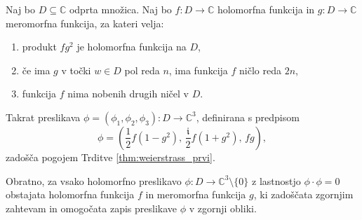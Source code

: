 \documentclass[fin1, tisk, bibtex]{fmfdelo}
\begin{document}
\begin{izrek}
    Naj bo $D \subseteq \mathbb{C}$ odprta množica. Naj bo $f: D \rightarrow \mathbb{C}$ holomorfna funkcija in $g: D \rightarrow \mathbb{C}$ meromorfna funkcija, za kateri velja:
    \begin{enumerate}
        \item produkt $f g^2$ je holomorfna funkcija na $D$,
        \item če ima $g$ v točki $w \in D$ pol reda $n$, ima funkcija $f$ ničlo reda $2n$,
        \item funkcija $f$ nima nobenih drugih ničel v $D$.
    \end{enumerate}
    Takrat preslikava $\phi = (\phi_1, \phi_2, \phi_3): D \rightarrow \mathbb{C}^3$, definirana s predpisom
    \begin{equation*}
        \phi = \left(\frac{1}{2} f\left(1-g^2\right), \, \frac{\mathfrak{i}}{2} f\left(1+g^2\right), \, f g\right),
    \end{equation*}
    zadošča pogojem Trditve \ref{thm:weierstrass_prvi}.

    Obratno, za vsako holomorfno preslikavo $\phi: D \rightarrow \mathbb{C}^3 \setminus \{0\}$ z lastnostjo $\phi \cdot \phi = 0$ obstajata holomorfna funkcija $f$ in meromorfna funkcija $g$, ki zadoščata zgornjim zahtevam in omogočata zapis preslikave $\phi$ v zgornji obliki.
\end{izrek}
\end{document}
